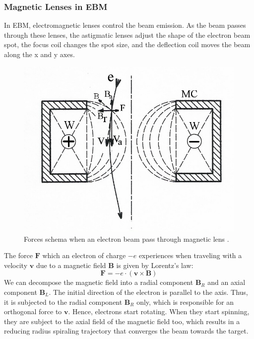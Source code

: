 \subsubsection{Magnetic Lenses in EBM}
\label{sssec:magneticlens}
In EBM, electromagnetic lenses control the beam emission. As the beam passes through these lenses, the astigmatic lenses adjust the shape of the electron beam spot, the focus coil changes the spot size, and the deflection coil moves the beam along the x and y axes.
\begin{figure}
    \centering
    \includegraphics[scale=0.7]{Images/Magnetic_lens.jpg}
    \caption[Magnetic lens.]{Forces schema when an electron beam pass through magnetic lens \cite{wikipedia_magnetic_2023}.}
    \label{fig:magneticlens}
\end{figure}
The force $\mathbf{F}$ which an electron of charge $-e$ experiences when traveling with a velocity $\mathbf{v}$ due to a magnetic field $\mathbf{B}$ is given by Lorentz's law:
\begin{equation}
    \mathbf{F} = -e\cdot \left( \mathbf{v} \times \mathbf{B}\right)
\end{equation}
We can decompose the magnetic field into a radial component $\mathbf{B}_R$ and an axial component $\mathbf{B}_L$. The initial direction of the electron is parallel to the axis. Thus, it is subjected to the radial component $\mathbf{B}_R$ only, which is responsible for an orthogonal force to $\mathbf{v}$. Hence, electrons start rotating. When they start spinning, they are subject to the axial field of the magnetic field too, which results in a reducing radius spiraling trajectory that converges the beam towards the target.
